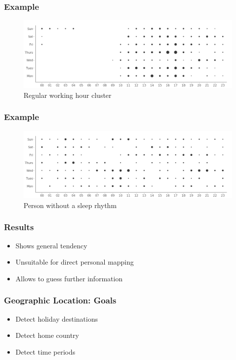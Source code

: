 \documentclass[t]{beamer}
\begin{document}
\begin{frame}
    \frametitle{Example}
    \begin{figure}[H]
        \includegraphics[scale=0.22]{analysis/ordered-punchcard}
        \centering
        \caption{Regular working hour cluster}
    \end{figure}
\end{frame}

\begin{frame}
    \frametitle{Example}
    \begin{figure}[H]
        \includegraphics[scale=0.22]{analysis/random-punchcard}
        \centering
        \caption{Person without a sleep rhythm}
    \end{figure}
\end{frame}


\begin{frame}
    \frametitle{Results}
    \begin{itemize}
        \item Shows general tendency
        \pause{}
        \item Unsuitable for direct personal mapping
        \pause{}
        \item Allows to guess further information
    \end{itemize}
\end{frame}


\begin{frame}
    \frametitle{Geographic Location: Goals}
    \begin{itemize}
        \item Detect holiday destinations
        \pause{}
        \item Detect home country
        \pause{}
        \item Detect time periods
    \end{itemize}
\end{frame}
\end{document}
